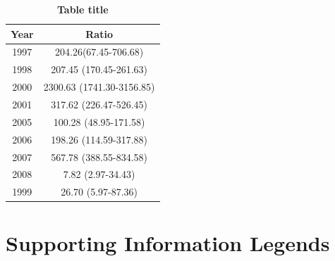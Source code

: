 \begin{table}
\caption{\bf{Table title}}
 \begin{center}
            \begin{tabular}{c|c}
            \hline
            Year & Ratio \\
            \hline
            1997 & 204.26(67.45-706.68)\\
1998 & 207.45 (170.45-261.63)\\
2000 & 2300.63 (1741.30-3156.85)\\
2001 & 317.62 (226.47-526.45)\\
2005 & 100.28 (48.95-171.58)\\
2006 & 198.26 (114.59-317.88)\\
2007 & 567.78 (388.55-834.58)\\
2008 & 7.82 (2.97-34.43)\\
1999 & 26.70 (5.97-87.36)\\

        \hline
        \end{tabular}
        \end{center}
\end{table}


\section*{Supporting Information Legends}
%
% 



